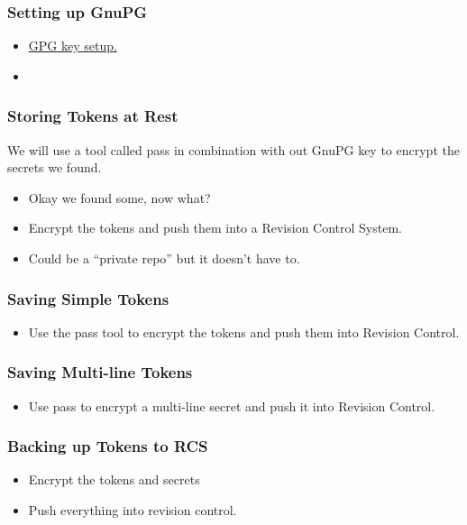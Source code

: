 \documentclass[aspectratio=169]{beamer}
\begin{document}
\begin{frame}
    \frametitle{Setting up GnuPG}
	\begin{itemize}
	\item \href{https://docs.github.com/en/authentication/managing-commit-signature-verification/generating-a-new-gpg-key}{GPG key setup.}
	\item 
\end{itemize}
\end{frame}

\begin{frame}
	\frametitle{Storing Tokens at Rest}
    We will use a tool called pass in combination with out GnuPG key to encrypt the secrets we found.
	\begin{itemize}
        \item Okay we found some, now what?
		\item Encrypt the tokens and push them into a Revision Control System.
        \item Could be a ``private repo'' but it doesn't have to.
	\end{itemize}
\end{frame}

\begin{frame}
	\frametitle{Saving Simple Tokens}
	\begin{itemize}
		\item Use the pass tool to encrypt the tokens and push them into Revision Control.
	\end{itemize}
\end{frame}

\begin{frame}
	\frametitle{Saving Multi-line Tokens}
	\begin{itemize}
		\item Use pass to encrypt a multi-line secret and push it into Revision Control.
	\end{itemize}
\end{frame}

\begin{frame}
	\frametitle{Backing up Tokens to RCS}
	\begin{itemize}
		\item Encrypt the tokens and secrets
		\item Push everything into revision control.
	\end{itemize}
\end{frame}
\end{document}
